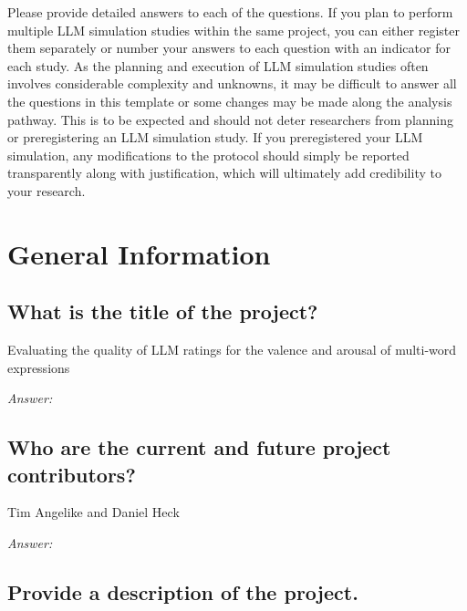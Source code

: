 \documentclass[12pt]{article}
\begin{document}
{		Please provide detailed answers to each of the questions. If you plan to perform multiple LLM simulation studies within the same project, you can either register them separately or number your answers to each question with an indicator for each study. As the planning and execution of LLM simulation studies often involves considerable complexity and unknowns, it may be difficult to answer all the questions in this template or some changes may be made along the analysis pathway. This is to be expected and should not deter researchers from planning or preregistering an LLM simulation study. If you preregistered your LLM simulation, any modifications to the protocol should simply be reported transparently along with justification, which will ultimately add credibility to your research.   
	}
	
	\section{General Information}
	\subsection{What is the title of the project?}
	
	\begin{examplebox}
		Evaluating the quality of LLM ratings for the valence and arousal of multi-word expressions
	\end{examplebox}
	
	\textit{Answer:}
	
	\subsection{Who are the current and future project contributors?}
	
	\begin{examplebox}
		Tim Angelike and Daniel Heck
	\end{examplebox}
	
	\textit{Answer:}
	
	\subsection{Provide a description of the project.}
	
	
\end{document}
